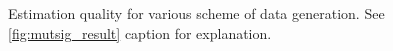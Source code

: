 \begin{figure}[]\ContinuedFloat
  \centering
  \caption{Estimation quality for various scheme of data generation. See \cref{fig:mutsig_result} caption for explanation.}
  \label{fig:mutsig_result_appendix_3}
\end{figure}


